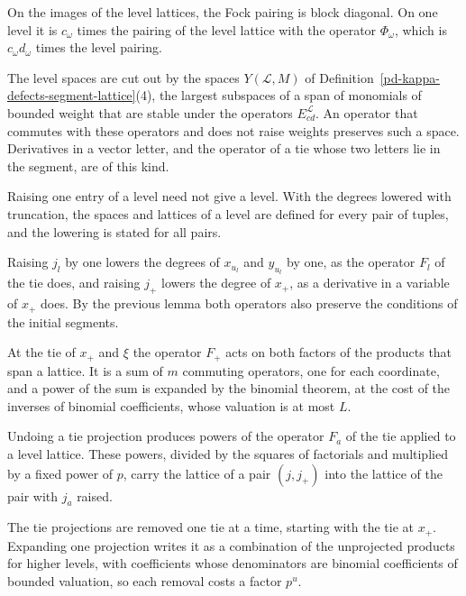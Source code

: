 On the images of the level lattices, the Fock pairing is block diagonal. On one level it is $c_\omega$ times the
pairing of the level lattice with the operator $\Phi_\omega$, which is $c_\omega d_\omega$ times the level pairing.

The level spaces are cut out by the spaces $Y(\mathcal L,M)$ of Definition~\ref{pd-kappa-defects-segment-lattice}(4),
the largest subspaces of a span of monomials of bounded weight that are stable under the operators
$E^{\mathcal L}_{cd}$. An operator that commutes with these operators and does not raise weights preserves such a
space. Derivatives in a vector letter, and the operator of a tie whose two letters lie in the segment, are of this
kind.

Raising one entry of a level need not give a level. With the degrees lowered with truncation, the spaces and
lattices of a level are defined for every pair of tuples, and the lowering is stated for all pairs.

Raising $j_l$ by one lowers the degrees of $x_{u_l}$ and $y_{u_l}$ by one, as the operator $F_l$ of the tie does, and
raising $j_+$ lowers the degree of $x_+$, as a derivative in a variable of $x_+$ does. By the previous lemma both
operators also preserve the conditions of the initial segments.

At the tie of $x_+$ and $\xi$ the operator $F_+$ acts on both factors of the products that span a lattice. It is a
sum of $m$ commuting operators, one for each coordinate, and a power of the sum is expanded by the binomial theorem,
at the cost of the inverses of binomial coefficients, whose valuation is at most $L$.

Undoing a tie projection produces powers of the operator $F_a$ of the tie applied to a level lattice. These
powers, divided by the squares of factorials and multiplied by a fixed power of $p$, carry the lattice of a pair
$(j,j_+)$ into the lattice of the pair with $j_a$ raised.

The tie projections are removed one tie at a time, starting with the tie at $x_+$. Expanding one projection writes
it as a combination of the unprojected products for higher levels, with coefficients whose denominators are
binomial coefficients of bounded valuation, so each removal costs a factor $p^u$.

